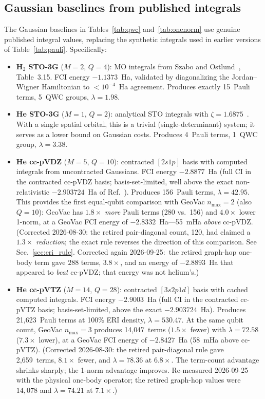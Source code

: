 \documentclass[aps,pra,twocolumn,superscriptaddress,longbibliography]{revtex4-2}
\newcommand{\gvq}[2]{#2}
\begin{document}
\subsection{Gaussian baselines from published integrals}
\label{sec:genuine_gaussian}

The Gaussian baselines in Tables~\ref{tab:qwc} and~\ref{tab:onenorm}
use genuine published integral values, replacing the synthetic
integrals used in earlier versions of Table~\ref{tab:pauli}.
Specifically:
\begin{itemize}
\item \textbf{H$_2$ STO-3G} ($M = 2$, $Q = 4$): MO integrals from
  Szabo and Ostlund~\cite{szabo1996}, Table~3.15.  FCI energy
  $-1.1373$~Ha, validated by diagonalizing the Jordan--Wigner
  Hamiltonian to $< 10^{-4}$~Ha agreement.  Produces exactly 15~Pauli
  terms, 5~QWC groups, $\lambda = 1.98$.
\item \textbf{He STO-3G} ($M = 1$, $Q = 2$): analytical STO integrals
  with $\zeta = 1.6875$~\cite{hehre1969}.  With a single spatial
  orbital, this is a trivial (single-determinant) system; it serves
  as a lower bound on Gaussian costs.  Produces 4~Pauli terms,
  1~QWC group, $\lambda = 3.38$.
\item \textbf{He cc-pVDZ} ($M = 5$, $Q = 10$): contracted $[2s1p]$
  basis with computed integrals from uncontracted Gaussians.  FCI
  energy $-2.8877$~Ha (full CI in the contracted cc-pVDZ basis;
  basis-set-limited, well above the exact non-relativistic
  $-2.903724$~Ha of Ref.~\cite{Pekeris1958}).  Produces 156~Pauli terms,
  $\lambda = 42.95$.  This provides the first equal-qubit comparison
  with GeoVac $n_{\max} = 2$ (also $Q = 10$): GeoVac has
  $1.8\times$ \emph{more} Pauli terms (\gvq{he_n2_pauli}{280} vs.\ 156) and $4.0\times$
  lower 1-norm, at a GeoVac FCI energy of $-2.8332$~Ha---55~mHa
  \emph{above} cc-pVDZ.  (Corrected 2026-08-30: the retired pair-diagonal count,
  120, had claimed a $1.3\times$ \emph{reduction}; the exact rule reverses
  the direction of this comparison.  See Sec.~\ref{sec:eri_rule}.
  Corrected again 2026-09-25:\ the retired graph-hop one-body term gave
  $288$ terms, $3.8\times$, and an energy of $-2.8893$~Ha that appeared to
  \emph{beat} cc-pVDZ; that energy was not helium's.)
\item \textbf{He cc-pVTZ} ($M = 14$, $Q = 28$): contracted
  $[3s2p1d]$ basis with cached computed integrals.  FCI energy
  $-2.9003$~Ha (full CI in the contracted cc-pVTZ basis;
  basis-set-limited, above the exact $-2.903724$~Ha).  Produces
  \gvq{he_ccpvtz_pauli}{21{,}623}~Pauli terms at 100\% ERI density, $\lambda = 530.47$.
  At the same qubit count, GeoVac $n_{\max} = 3$ produces
  \gvq{he_n3_pauli}{14{,}047}~terms ($1.5\times$ fewer) with $\lambda = \gvq{he_n3_lambda}{72.58}$
  ($7.3\times$ lower), at a GeoVac FCI energy of $-2.8427$~Ha (58~mHa
  above cc-pVTZ).  (Corrected 2026-08-30: the retired
  pair-diagonal rule gave 2{,}659~terms, $8.1\times$ fewer, and
  $\lambda = 78.36$ at $6.8\times$.  The term-count advantage shrinks
  sharply; the 1-norm advantage improves.  Re-measured 2026-09-25 with
  the physical one-body operator; the retired graph-hop values were
  $14{,}078$ and $\lambda = 74.21$ at $7.1\times$.)
\end{itemize}
\end{document}
